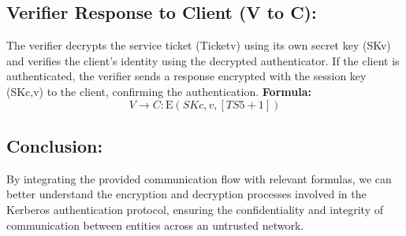 \documentclass[11pt]{article}
\begin{document}
\subsection*{Verifier Response to Client (V to C):}
The verifier decrypts the service ticket (Ticketv) using its own secret key (SKv) and verifies the client's identity using the decrypted authenticator. If the client is authenticated, the verifier sends a response encrypted with the session key (SKc,v) to the client, confirming the authentication.
\textbf{Formula:}
\[
V \rightarrow C : \text{E}(SKc,v, [TS5+1])
\]

\subsection{Conclusion:}
By integrating the provided communication flow with relevant formulas, we can better understand the encryption and decryption processes involved in the Kerberos authentication protocol, ensuring the confidentiality and integrity of communication between entities across an untrusted network.
\end{document}
